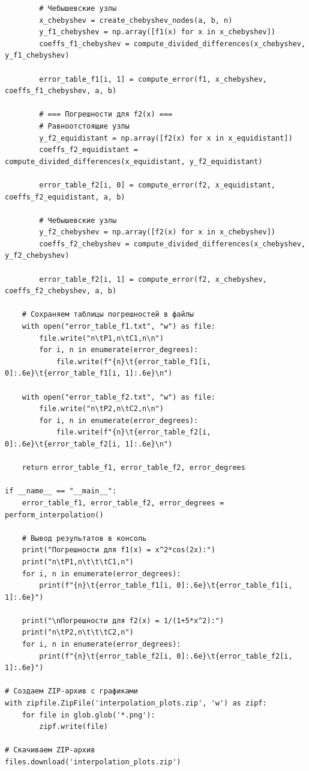 \documentclass[12pt]{article}
\begin{document}
\begin{verbatim}
        # Чебышевские узлы
        x_chebyshev = create_chebyshev_nodes(a, b, n)
        y_f1_chebyshev = np.array([f1(x) for x in x_chebyshev])
        coeffs_f1_chebyshev = compute_divided_differences(x_chebyshev, y_f1_chebyshev)
        
        error_table_f1[i, 1] = compute_error(f1, x_chebyshev, coeffs_f1_chebyshev, a, b)
        
        # === Погрешности для f2(x) ===
        # Равноотстоящие узлы
        y_f2_equidistant = np.array([f2(x) for x in x_equidistant])
        coeffs_f2_equidistant = compute_divided_differences(x_equidistant, y_f2_equidistant)
        
        error_table_f2[i, 0] = compute_error(f2, x_equidistant, coeffs_f2_equidistant, a, b)
        
        # Чебышевские узлы
        y_f2_chebyshev = np.array([f2(x) for x in x_chebyshev])
        coeffs_f2_chebyshev = compute_divided_differences(x_chebyshev, y_f2_chebyshev)
        
        error_table_f2[i, 1] = compute_error(f2, x_chebyshev, coeffs_f2_chebyshev, a, b)
    
    # Сохраняем таблицы погрешностей в файлы
    with open("error_table_f1.txt", "w") as file:
        file.write("n\tP1,n\tC1,n\n")
        for i, n in enumerate(error_degrees):
            file.write(f"{n}\t{error_table_f1[i, 0]:.6e}\t{error_table_f1[i, 1]:.6e}\n")
    
    with open("error_table_f2.txt", "w") as file:
        file.write("n\tP2,n\tC2,n\n")
        for i, n in enumerate(error_degrees):
            file.write(f"{n}\t{error_table_f2[i, 0]:.6e}\t{error_table_f2[i, 1]:.6e}\n")
    
    return error_table_f1, error_table_f2, error_degrees

if __name__ == "__main__":
    error_table_f1, error_table_f2, error_degrees = perform_interpolation()
    
    # Вывод результатов в консоль
    print("Погрешности для f1(x) = x^2*cos(2x):")
    print("n\tP1,n\t\t\tC1,n")
    for i, n in enumerate(error_degrees):
        print(f"{n}\t{error_table_f1[i, 0]:.6e}\t{error_table_f1[i, 1]:.6e}")
    
    print("\nПогрешности для f2(x) = 1/(1+5*x^2):")
    print("n\tP2,n\t\t\tC2,n")
    for i, n in enumerate(error_degrees):
        print(f"{n}\t{error_table_f2[i, 0]:.6e}\t{error_table_f2[i, 1]:.6e}")

# Создаем ZIP-архив с графиками
with zipfile.ZipFile('interpolation_plots.zip', 'w') as zipf:
    for file in glob.glob('*.png'):
        zipf.write(file)

# Скачиваем ZIP-архив
files.download('interpolation_plots.zip')
\end{verbatim}
\end{document}
